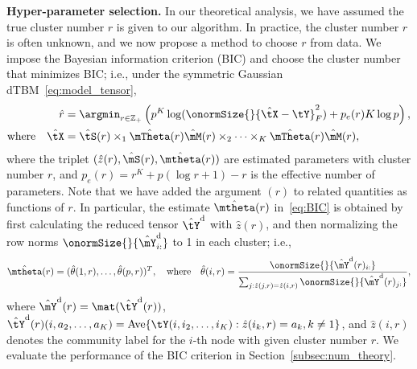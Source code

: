 \documentclass[lettersize,onecolumn,journal]{IEEEtran}
\theoremstyle{definition}
\theoremstyle{definition}
\newcommand{\of}[1]{\left(#1\right)}
\begin{document}
{\bf Hyper-parameter selection.} In our theoretical analysis, we have assumed the true cluster number $r$ is given to our algorithm. In practice, the cluster number $r$ is often unknown, and we now propose a method to choose $r$ from data. We impose the Bayesian information criterion (BIC) and choose the cluster number that minimizes BIC; i.e., under the symmetric Gaussian dTBM~\eqref{eq:model_tensor},
\begin{align}\label{eq:BIC}
 \hat r &= \argmin_{r \in \mathbb{Z}_+ } \of{p^K \log(\onormSize{}{\hat \tX - \tY}_F^2)  + p_e(r) K \log p},\\
 \text{where}  \quad \hat \tX &= \hat \tS(r) \times_1 \hat \mTheta(r) \hat \mM(r) \times_2 \cdots \times_K \hat \mTheta(r) \hat \mM(r),
\end{align}
where the triplet $(\hat z(r), \hat \mS(r),\hat \mtheta(r))$ are estimated parameters with cluster number $r$, and $p_e (r)= r^K + p(\log r + 1) - r$ is the effective number of parameters. Note that we have added the argument $(r)$ to related quantities as functions of $r$. In particular, the estimate $\hat \mtheta(r)$ in~\eqref{eq:BIC} is obtained by first calculating the reduced tensor $\hat \tY^{\text{d}}$ with $\hat z(r)$, and then normalizing the row norms $\onormSize{}{\hat \mY_{i:}^{\text{d}}}$ to 1 in each cluster; i.e., 
\begin{equation}
 \hat \mtheta(r)=(\hat \theta(1,r),\ldots,\hat \theta(p,r))^T,\quad\text{where}\quad   \hat \theta(i,r) = \frac{\onormSize{}{\hat \mY^{\text{d}}(r)_{i:}}}{\sum_{j: \hat z(j,r) =  \hat z(i,r)} \onormSize{}{\hat \mY^{\text{d}}(r)_{j:}}},
\end{equation}
where $\hat \mY^{\text{d}}(r) = \mat(\hat \tY^{\text{d}}(r))$, $\hat \tY^{\text{d}}(r)(i,a_2,\ldots,a_K) =  \text{Ave}\{\tY(i,i_2,\ldots,i_K): \hat z(i_k, r) = a_k, k \neq 1 \}$, and $\hat z(i,r)$ denotes the community label for the $i$-th node with given cluster number $r$. We evaluate the performance of the BIC criterion in Section~\ref{subsec:num_theory}.
\end{document}
